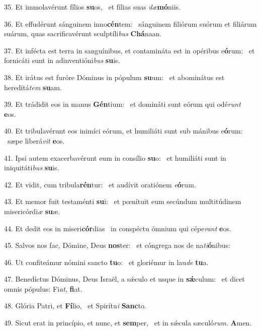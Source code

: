 35. Et immolavérunt fílios \textbf{su}os, \ast\  et fílias suas \textit{dæ}\textbf{mó}niis.\

36. Et effudérunt sánguinem inno\textbf{cén}tem: \ast\  sánguinem filiórum suórum et filiárum suárum, quas sacrificavérunt sculptíli\textit{bus} \textbf{Chá}naan.\

37. Et infécta est terra in sanguínibus, et contamináta est in opéribus e\textbf{ó}rum: \ast\  et fornicáti sunt in adinventióni\textit{bus} \textbf{su}is.\

38. Et irátus est furóre Dóminus in pópulum \textbf{su}um: \ast\  et abominátus est hereditá\textit{tem} \textbf{su}am.\

39. Et trádidit eos in manus \textbf{Gén}tium: \ast\  et domináti sunt eórum qui odé\textit{runt} \textbf{e}os.\

40. Et tribulavérunt eos inimíci eórum, et humiliáti sunt sub mánibus e\textbf{ó}rum: \ast\  sæpe liberá\textit{vit} \textbf{e}os.\

41. Ipsi autem exacerbavérunt eum in consílio \textbf{su}o: \ast\  et humiliáti sunt in iniquitáti\textit{bus} \textbf{su}is.\

42. Et vidit, cum tribula\textbf{rén}tur: \ast\  et audívit oratiónem \textit{e}\textbf{ó}rum.\

43. Et memor fuit testaménti \textbf{su}i: \ast\  et pœnítuit eum secúndum multitúdinem misericórdi\textit{æ} \textbf{su}æ.\

44. Et dedit eos in miseri\textbf{cór}dias \ast\  in conspéctu ómnium qui cépe\textit{rant} \textbf{e}os.\

45. Salvos nos fac, Dómine, Deus \textbf{nos}ter: \ast\  et cóngrega nos de na\textit{ti}\textbf{ó}nibus:\

46. Ut confiteámur nómini sancto \textbf{tu}o: \ast\  et gloriémur in lau\textit{de} \textbf{tu}a.\

47. Benedíctus Dóminus, Deus Israël, a sǽculo et usque in \textbf{sǽ}culum: \ast\  et dicet omnis pópulus: Fi\textit{at}, \textbf{fi}at.\

48. Glória Patri, et \textbf{Fí}lio, \ast\  et Spirítu\textit{i} \textbf{Sanc}to.\

49. Sicut erat in princípio, et nunc, et \textbf{sem}per, \ast\  et in sǽcula sæculó\textit{rum}. \textbf{A}men.\


